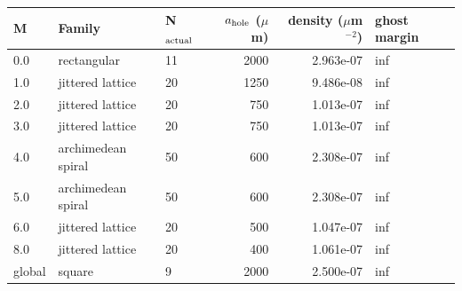 \begin{longtable}{lllrrl}
\toprule M & Family & N$_{\rm actual}$ & $a_{\rm hole}$ ($\mu$m) & density ($\mu$m$^{-2}$) & ghost margin \\ \midrule \endhead
0.0 & rectangular & 11 & 2000 & 2.963e-07 & inf \\
1.0 & jittered lattice & 20 & 1250 & 9.486e-08 & inf \\
2.0 & jittered lattice & 20 & 750 & 1.013e-07 & inf \\
3.0 & jittered lattice & 20 & 750 & 1.013e-07 & inf \\
4.0 & archimedean spiral & 50 & 600 & 2.308e-07 & inf \\
5.0 & archimedean spiral & 50 & 600 & 2.308e-07 & inf \\
6.0 & jittered lattice & 20 & 500 & 1.047e-07 & inf \\
8.0 & jittered lattice & 20 & 400 & 1.061e-07 & inf \\
global & square & 9 & 2000 & 2.500e-07 & inf \\
\bottomrule \end{longtable}

